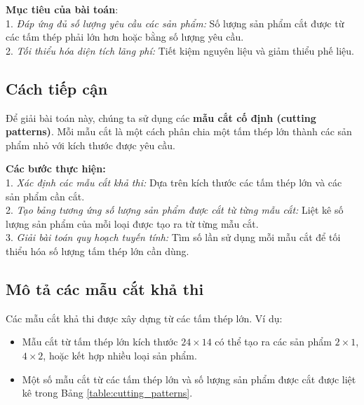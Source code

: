 \documentclass[a4paper]{article}
\begin{document}
\hspace{11pt}
\textbf{Mục tiêu của bài toán}: \\ 
1. \textit{Đáp ứng đủ số lượng yêu cầu các sản phẩm:} Số lượng sản phẩm cắt được từ các tấm thép phải lớn hơn hoặc bằng số lượng yêu cầu.  \\
2. \textit{Tối thiểu hóa diện tích lãng phí:} Tiết kiệm nguyên liệu và giảm thiểu phế liệu.

\subsection{Cách tiếp cận}
\hspace{11pt}
Để giải bài toán này, chúng ta sử dụng các \textbf{mẫu cắt cố định (cutting patterns)}. Mỗi mẫu cắt là một cách phân chia một tấm thép lớn thành các sản phẩm nhỏ với kích thước được yêu cầu.  

\textbf{Các bước thực hiện:}\\
\hspace{11pt}
1. \textit{Xác định các mẫu cắt khả thi:} Dựa trên kích thước các tấm thép lớn và các sản phẩm cần cắt. \\ 

\hspace{11pt}
2. \textit{Tạo bảng tương ứng số lượng sản phẩm được cắt từ từng mẫu cắt:} Liệt kê số lượng sản phẩm của mỗi loại được tạo ra từ từng mẫu cắt.\\  

\hspace{11pt}
3. \textit{Giải bài toán quy hoạch tuyến tính:} Tìm số lần sử dụng mỗi mẫu cắt để tối thiểu hóa số lượng tấm thép lớn cần dùng. \\ 

\subsection{Mô tả các mẫu cắt khả thi}
Các mẫu cắt khả thi được xây dựng từ các tấm thép lớn. Ví dụ:  
\begin{itemize}
    \item Mẫu cắt từ tấm thép lớn kích thước \( 24 \times 14 \) có thể tạo ra các sản phẩm \( 2 \times 1 \), \( 4 \times 2 \), hoặc kết hợp nhiều loại sản phẩm.  
    \item Một số mẫu cắt từ các tấm thép lớn và số lượng sản phẩm được cắt được liệt kê trong Bảng \ref{table:cutting_patterns}.
\end{itemize}
\end{document}
